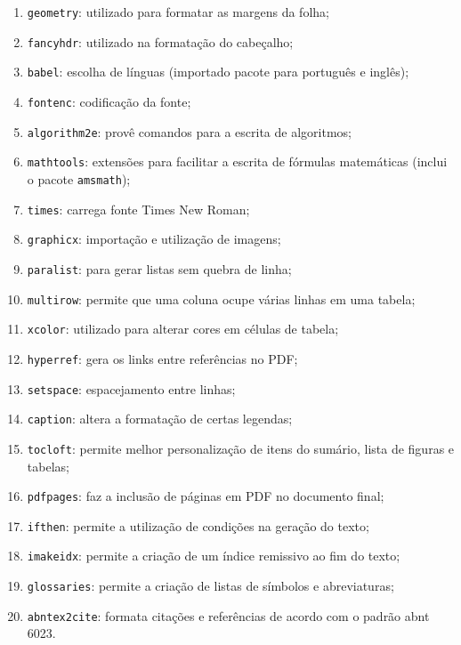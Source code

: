 \documentclass{fei}
\begin{document}
    \begin{enumerate}
        \item\texttt{geometry}: utilizado para formatar as margens da folha;
        \item\texttt{fancyhdr}: utilizado na formatação do cabeçalho;
        \item\texttt{babel}: escolha de línguas (importado pacote para português e inglês);
        \item\texttt{fontenc}: codificação da fonte;
        \item\texttt{algorithm2e}: provê comandos para a escrita de algoritmos;
        \item\texttt{mathtools}: extensões para facilitar a escrita de fórmulas matemáticas (inclui o pacote \texttt{amsmath});
        \item\texttt{times}: carrega fonte Times New Roman;
        \item\texttt{graphicx}: importação e utilização de imagens;
        \item\texttt{paralist}: para gerar listas sem quebra de linha;
        \item\texttt{multirow}: permite que uma coluna ocupe várias linhas em uma tabela;
        \item\texttt{xcolor}: utilizado para alterar cores em células de tabela;
        \item\texttt{hyperref}: gera os links entre referências no PDF;
        \item\texttt{setspace}: espacejamento entre linhas;
        \item\texttt{caption}: altera a formatação de certas legendas;
        \item\texttt{tocloft}: permite melhor personalização de itens do sumário, lista de figuras e tabelas;
        \item\texttt{pdfpages}: faz a inclusão de páginas em PDF no documento final;
        \item\texttt{ifthen}: permite a utilização de condições na geração do texto;
        \item\texttt{imakeidx}: permite a criação de um índice remissivo ao fim do texto;
        \item\texttt{glossaries}: permite a criação de listas de símbolos e abreviaturas;
        \item\texttt{abntex2cite}: formata citações e referências de acordo com o padrão \gls{abnt} 6023.
    \end{enumerate}
\end{document}

